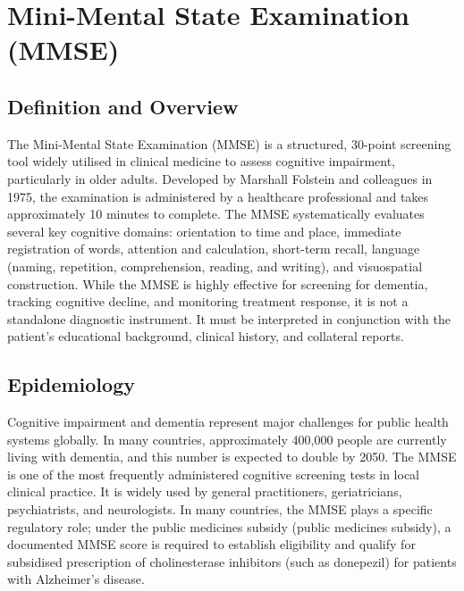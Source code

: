 \chapter{Mini-Mental State Examination (MMSE)}

\section*{Definition and Overview}
The Mini-Mental State Examination (MMSE) is a structured, 30-point screening tool widely utilised in clinical medicine to assess cognitive impairment, particularly in older adults. Developed by Marshall Folstein and colleagues in 1975, the examination is administered by a healthcare professional and takes approximately 10 minutes to complete. The MMSE systematically evaluates several key cognitive domains: orientation to time and place, immediate registration of words, attention and calculation, short-term recall, language (naming, repetition, comprehension, reading, and writing), and visuospatial construction. While the MMSE is highly effective for screening for dementia, tracking cognitive decline, and monitoring treatment response, it is not a standalone diagnostic instrument. It must be interpreted in conjunction with the patient's educational background, clinical history, and collateral reports.

\section*{Epidemiology}
Cognitive impairment and dementia represent major challenges for public health systems globally. In many countries, approximately 400,000 people are currently living with dementia, and this number is expected to double by 2050. The MMSE is one of the most frequently administered cognitive screening tests in local clinical practice. It is widely used by general practitioners, geriatricians, psychiatrists, and neurologists. In many countries, the MMSE plays a specific regulatory role; under the public medicines subsidy (public medicines subsidy), a documented MMSE score is required to establish eligibility and qualify for subsidised prescription of cholinesterase inhibitors (such as donepezil) for patients with Alzheimer's disease.

